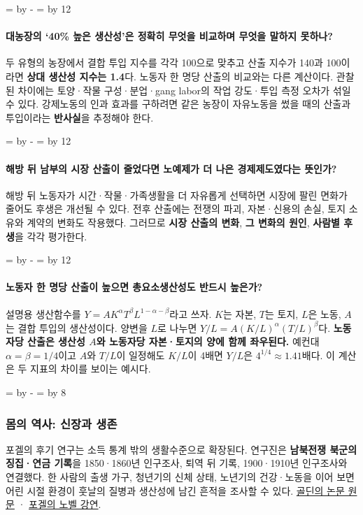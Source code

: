 \documentclass[10pt,a4paper]{article}
\newcommand{\ReserveQuestionSpace}{%
  \par\begingroup
  \dimen0=\pagegoal \advance\dimen0 by -\pagetotal
  \dimen2=\baselineskip \multiply\dimen2 by 12
  \ifdim\dimen0<\dimen2 \newpage\fi
  \endgroup}
\newcommand{\ReserveReadingSectionSpace}{%
  \par\begingroup
  \dimen0=\pagegoal \advance\dimen0 by -\pagetotal
  \dimen2=\baselineskip \multiply\dimen2 by 8
  \ifdim\dimen0<\dimen2 \newpage\fi
  \endgroup}
\begin{document}
\ReserveQuestionSpace
\paragraph{대농장의 ‘40\% 높은 생산성’은 정확히 무엇을 비교하며 무엇을 말하지 못하나?}
두 유형의 농장에서 결합 투입 지수를 각각 100으로 맞추고 산출 지수가 140과 100이라면 \textbf{상대 생산성 지수는 1.4}다. 노동자 한 명당 산출의 비교와는 다른 계산이다. 관찰된 차이에는 토양·작물 구성·분업·gang labor의 작업 강도·투입 측정 오차가 섞일 수 있다. 강제노동의 인과 효과를 구하려면 같은 농장이 자유노동을 썼을 때의 산출과 투입이라는 \textbf{반사실}을 추정해야 한다.\par

\ReserveQuestionSpace
\paragraph{해방 뒤 남부의 시장 산출이 줄었다면 노예제가 더 나은 경제제도였다는 뜻인가?}
해방 뒤 노동자가 시간·작물·가족생활을 더 자유롭게 선택하면 시장에 팔린 면화가 줄어도 후생은 개선될 수 있다. 전후 산출에는 전쟁의 파괴, 자본·신용의 손실, 토지 소유와 계약의 변화도 작용했다. 그러므로 \textbf{시장 산출의 변화}, \textbf{그 변화의 원인}, \textbf{사람별 후생}을 각각 평가한다.\par

\ReserveQuestionSpace
\paragraph{노동자 한 명당 산출이 높으면 총요소생산성도 반드시 높은가?}
설명용 생산함수를 $Y=A K^{\alpha}T^{\beta}L^{1-\alpha-\beta}$라고 쓰자. $K$는 자본, $T$는 토지, $L$은 노동, $A$는 결합 투입의 생산성이다. 양변을 $L$로 나누면 $Y/L=A(K/L)^{\alpha}(T/L)^{\beta}$다. \textbf{노동자당 산출은 생산성 $A$와 노동자당 자본·토지의 양에 함께 좌우된다.} 예컨대 $\alpha=\beta=1/4$이고 $A$와 $T/L$이 일정해도 $K/L$이 4배면 $Y/L$은 $4^{1/4}\approx1.41$배다. 이 계산은 두 지표의 차이를 보이는 예시다.\par

\ReserveReadingSectionSpace
\subsubsection*{몸의 역사: 신장과 생존}

포겔의 후기 연구는 소득 통계 밖의 생활수준으로 확장된다. 연구진은 \textbf{남북전쟁 북군의 징집·연금 기록}을 1850·1860년 인구조사, 퇴역 뒤 기록, 1900·1910년 인구조사와 연결했다. 한 사람의 출생 가구, 청년기의 신체 상태, 노년기의 건강·노동을 이어 보면 어린 시절 환경이 훗날의 질병과 생산성에 남긴 흔적을 조사할 수 있다. \href{https://goldin.scholars.harvard.edu/sites/g/files/omnuum5966/files/goldin/files/cliometrics.pdf}{골딘의 논문 원문} · \href{https://www.nobelprize.org/uploads/2018/06/fogel-lecture.pdf}{포겔의 노벨 강연}.\par
\end{document}
